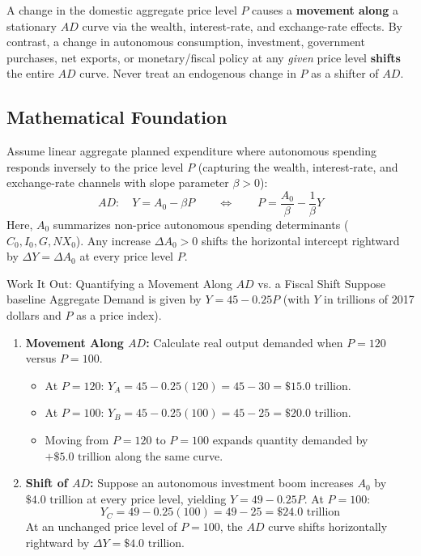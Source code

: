 \documentclass[11pt,letterpaper]{article}
\begin{document}
\begin{coreprinciple}
A change in the domestic aggregate price level $P$ causes a \textbf{movement along} a stationary $AD$ curve via the wealth, interest-rate, and exchange-rate effects. By contrast, a change in autonomous consumption, investment, government purchases, net exports, or monetary/fiscal policy at any \emph{given} price level \textbf{shifts} the entire $AD$ curve. Never treat an endogenous change in $P$ as a shifter of $AD$.
\end{coreprinciple}

\subsection*{Mathematical Foundation}
Assume linear aggregate planned expenditure where autonomous spending responds inversely to the price level $P$ (capturing the wealth, interest-rate, and exchange-rate channels with slope parameter $\beta > 0$):
\[
AD: \quad Y = A_0 - \beta P \qquad \Longleftrightarrow \qquad P = \frac{A_0}{\beta} - \frac{1}{\beta} Y
\]
Here, $A_0$ summarizes non-price autonomous spending determinants ($C_0, I_0, G, NX_0$). Any increase $\Delta A_0 > 0$ shifts the horizontal intercept rightward by $\Delta Y = \Delta A_0$ at every price level $P$.

\begin{examplecase}{Work It Out: Quantifying a Movement Along $AD$ vs. a Fiscal Shift}
Suppose baseline Aggregate Demand is given by $Y = 45 - 0.25P$ (with $Y$ in trillions of 2017 dollars and $P$ as a price index).
\begin{enumerate}
    \item \textbf{Movement Along $AD$:} Calculate real output demanded when $P = 120$ versus $P = 100$.
    \begin{itemize}
        \item At $P = 120$: $Y_A = 45 - 0.25(120) = 45 - 30 = \$15.0\text{ trillion}$.
        \item At $P = 100$: $Y_B = 45 - 0.25(100) = 45 - 25 = \$20.0\text{ trillion}$.
        \item Moving from $P = 120$ to $P = 100$ expands quantity demanded by $+\$5.0\text{ trillion}$ along the same curve.
    \end{itemize}
    \item \textbf{Shift of $AD$:} Suppose an autonomous investment boom increases $A_0$ by $\$4.0\text{ trillion}$ at every price level, yielding $Y = 49 - 0.25P$. At $P = 100$:
    \[
    Y_C = 49 - 0.25(100) = 49 - 25 = \$24.0\text{ trillion}
    \]
    At an unchanged price level of $P = 100$, the $AD$ curve shifts horizontally rightward by $\Delta Y = \$4.0\text{ trillion}$.
\end{enumerate}
\end{examplecase}
\end{document}

